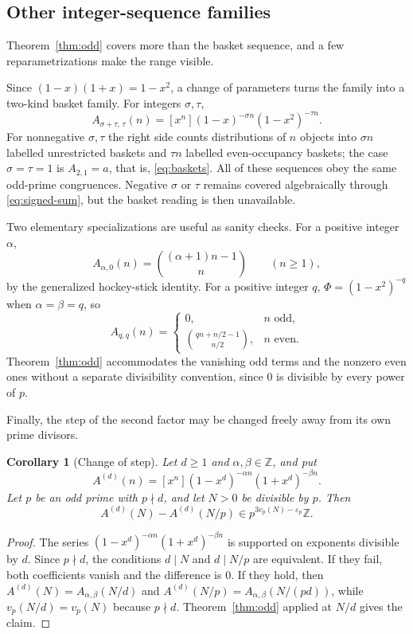 \documentclass[11pt,a4paper]{article}
\numberwithin{equation}{section}
\newtheorem{corollary}[theorem]{Corollary}
\theoremstyle{definition}
\theoremstyle{remark}
\newcommand{\Z}{\mathbb Z}
\newcommand{\eps}{\varepsilon}
\begin{document}
\subsection{Other integer-sequence families}
\label{sec:families}
Theorem~\ref{thm:odd} covers more than the basket sequence, and a few
reparametrizations make the range visible.

Since $(1-x)(1+x)=1-x^2$, a change of parameters turns the family into a
two-kind basket family. For integers $\sigma,\tau$,
\begin{equation}\label{eq:alpha-beta}
 A_{\sigma+\tau,\,\tau}(n)
 =[x^n](1-x)^{-\sigma n}(1-x^2)^{-\tau n}.
\end{equation}
For nonnegative $\sigma,\tau$ the right side counts distributions of $n$
objects into $\sigma n$ labelled unrestricted baskets and $\tau n$ labelled
even-occupancy baskets; the case $\sigma=\tau=1$ is $A_{2,1}=a$, that is,
\eqref{eq:baskets}. All of these sequences obey the same odd-prime
congruences. Negative $\sigma$ or $\tau$ remains covered algebraically
through \eqref{eq:signed-sum}, but the basket reading is then unavailable.

Two elementary specializations are useful as sanity checks. For a positive
integer $\alpha$,
\begin{equation}\label{eq:spec-u0}
 A_{\alpha,0}(n)=\binom{(\alpha+1)n-1}{n}\qquad(n\ge1),
\end{equation}
by the generalized hockey-stick identity. For a positive integer $q$,
$\Phi=(1-x^2)^{-q}$ when $\alpha=\beta=q$, so
\begin{equation}\label{eq:spec-qq}
 A_{q,q}(n)=
 \begin{cases}
 0,&n\text{ odd},\\[2pt]
 \displaystyle\binom{qn+n/2-1}{n/2},&n\text{ even}.
 \end{cases}
\end{equation}
Theorem~\ref{thm:odd} accommodates the vanishing odd terms and the nonzero
even ones without a separate divisibility convention, since $0$ is divisible
by every power of $p$.

Finally, the step of the second factor may be changed freely away from its
own prime divisors.

\begin{corollary}[Change of step]\label{cor:step}
Let $d\ge1$ and $\alpha,\beta\in\Z$, and put
\[
 A^{(d)}(n)=[x^n](1-x^d)^{-\alpha n}(1+x^d)^{-\beta n}.
\]
Let $p$ be an odd prime with $p\nmid d$, and let $N>0$ be divisible by $p$.
Then
\[
 A^{(d)}(N)-A^{(d)}(N/p)\in p^{3v_p(N)-\eps_p}\Z.
\]
\end{corollary}
\begin{proof}
The series $(1-x^d)^{-\alpha n}(1+x^d)^{-\beta n}$ is supported on exponents
divisible by $d$. Since $p\nmid d$, the conditions $d\mid N$ and
$d\mid N/p$ are equivalent. If they fail, both coefficients vanish and the
difference is $0$. If they hold, then
$A^{(d)}(N)=A_{\alpha,\beta}(N/d)$ and $A^{(d)}(N/p)=A_{\alpha,\beta}(N/(pd))$,
while $v_p(N/d)=v_p(N)$ because $p\nmid d$. Theorem~\ref{thm:odd} applied at
$N/d$ gives the claim.
\end{proof}
\end{document}
